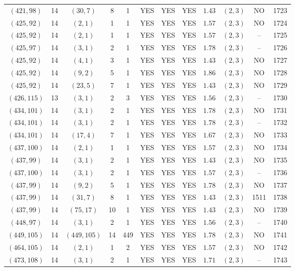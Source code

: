 \begin{longtable}{|c|c|c|c|c|c|c|c|c|c|c|c|}
$(421,98)$ & 14 & $(30,7)$ & 8 & 1 & YES & YES & YES & $1.43$ & $(2,3)$ & NO & 1723\\
$(425,92)$ & 14 & $(2,1)$ & 1 & 1 & YES & YES & YES & $1.57$ & $(2,3)$ & NO & 1724\\
$(425,92)$ & 14 & $(2,1)$ & 1 & 1 & YES & YES & YES & $1.57$ & $(2,3)$ & -- & 1725\\
$(425,97)$ & 14 & $(3,1)$ & 2 & 1 & YES & YES & YES & $1.78$ & $(2,3)$ & -- & 1726\\
$(425,92)$ & 14 & $(4,1)$ & 3 & 1 & YES & YES & YES & $1.43$ & $(2,3)$ & NO & 1727\\
$(425,92)$ & 14 & $(9,2)$ & 5 & 1 & YES & YES & YES & $1.86$ & $(2,3)$ & NO & 1728\\
$(425,92)$ & 14 & $(23,5)$ & 7 & 1 & YES & YES & YES & $1.43$ & $(2,3)$ & NO & 1729\\
$(426,115)$ & 13 & $(3,1)$ & 2 & 3 & YES & YES & YES & $1.56$ & $(2,3)$ & -- & 1730\\
$(434,101)$ & 14 & $(3,1)$ & 2 & 1 & YES & YES & YES & $1.78$ & $(2,3)$ & NO & 1731\\
$(434,101)$ & 14 & $(3,1)$ & 2 & 1 & YES & YES & YES & $1.78$ & $(2,3)$ & -- & 1732\\
$(434,101)$ & 14 & $(17,4)$ & 7 & 1 & YES & YES & YES & $1.67$ & $(2,3)$ & NO & 1733\\
$(437,100)$ & 14 & $(2,1)$ & 1 & 1 & YES & YES & YES & $1.57$ & $(2,3)$ & NO & 1734\\
$(437,99)$ & 14 & $(3,1)$ & 2 & 1 & YES & YES & YES & $1.43$ & $(2,3)$ & NO & 1735\\
$(437,100)$ & 14 & $(3,1)$ & 2 & 1 & YES & YES & YES & $1.57$ & $(2,3)$ & -- & 1736\\
$(437,99)$ & 14 & $(9,2)$ & 5 & 1 & YES & YES & YES & $1.78$ & $(2,3)$ & NO & 1737\\
$(437,99)$ & 14 & $(31,7)$ & 8 & 1 & YES & YES & YES & $1.43$ & $(2,3)$ & 1511 & 1738\\
$(437,99)$ & 14 & $(75,17)$ & 10 & 1 & YES & YES & YES & $1.43$ & $(2,3)$ & NO & 1739\\
$(448,97)$ & 14 & $(3,1)$ & 2 & 1 & YES & YES & YES & $1.56$ & $(2,3)$ & -- & 1740\\
$(449,105)$ & 14 & $(449,105)$ & 14 & 449 & YES & YES & YES & $1.78$ & $(2,3)$ & NO & 1741\\
$(464,105)$ & 14 & $(2,1)$ & 1 & 2 & YES & YES & YES & $1.57$ & $(2,3)$ & NO & 1742\\
$(473,108)$ & 14 & $(3,1)$ & 2 & 1 & YES & YES & YES & $1.71$ & $(2,3)$ & -- & 1743\\

\end{longtable}
